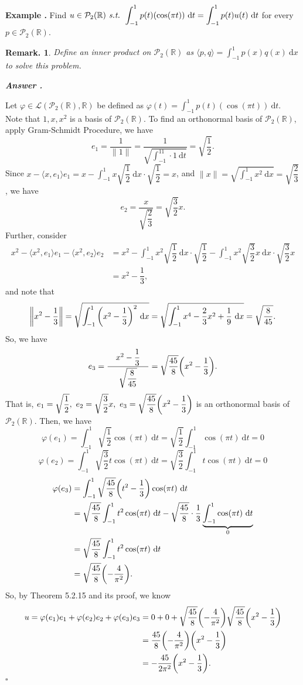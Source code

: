 \documentclass[11pt, letterpaper]{article}
\newcounter{index}[subsection]
\newenvironment*{eg}{\begin{framed}\par\noindent\textbf{Example \thesubsection.\stepcounter{index}\theindex}}{\par\end{framed}}
\newcounter{nprf}[subsection]
\newenvironment*{ans}{\par\indent\textbf{\textit{Answer \stepcounter{nprf}\thenprf.}}\par}{\hfill{$\square$}\par}
\newtheorem*{rmk}{Remark.}
\def\dsst{\displaystyle}
\def\R{\mathbb{R}}
\def\d{\mathrm{d}}
\def\P{\mathcal{P}}
\def\L{\mathcal{L}}
\def\phi{\varphi}
\def\st{\emph{ s.t. }}
\begin{document}
\begin{eg}{}
	Find $u\in\P_2(\R)\st\dsst\int_{-1}^1p(t)(\cos(\pi t))\ \d t=\int_{-1}^1p(t)u(t)\ \d t$ for every $p\in\P_2(\R)$.
	\begin{rmk} Define an inner product on $\P_2(\R)$ as $\langle p,q\rangle=\dsst\int_{-1}^1p(x)q(x)\ \d x$ to solve this problem.\end{rmk}
	\begin{ans}
		Let $\phi\in\L(\P_2(\R),\R)$ be defined as $\phi(t)=\dsst\int_{-1}^1p(t)(\cos(\pi t))\ \d t$. Note that $1,x,x^2$ is a basis of $\P_2(\R)$. To find an orthonormal basis of $\P_2(\R)$, apply Gram-Schmidt Procedure, we have \[e_1=\dfrac{1}{\|1\|}=\dfrac{1}{\sqrt{\dsst\int_{-1}^11\cdot1\ \d t}}=\sqrt{\dfrac{1}{2}}.\] Since $x-\langle x,e_1\rangle e_1=x-\dsst\int_{-1}^1x\sqrt{\dfrac{1}{2}}\ \d x\cdot\sqrt{\dfrac{1}{2}}=x$, and $\|x\|=\sqrt{\dsst\int_{-1}^1x^2\ \d x}=\sqrt{\dfrac{2}{3}}$, we have \[e_2=\dfrac{x}{\sqrt{\dfrac{2}{3}}}=\sqrt{\dfrac{3}{2}}x.\] Further, consider \[\begin{aligned}x^2-\langle x^2,e_1\rangle e_1-\langle x^2,e_2\rangle e_2&=x^2-\dsst\int_{-1}^1x^2\sqrt{\dfrac{1}{2}}\ \d x\cdot\sqrt{\dfrac{1}{2}}-\int_{-1}^1x^2\sqrt{\dfrac{3}{2}}x\ \d x\cdot\sqrt{\dfrac{3}{2}}x\\&=x^2-\dfrac{1}{3},\end{aligned}\] and note that \[\left\|x^2-\dfrac{1}{3}\right\|=\sqrt{\int_{-1}^1\qty(x^2-\dfrac{1}{3})^2\ \d x}=\sqrt{\int_{-1}^1x^4-\dfrac{2}{3}x^2+\dfrac{1}{9}\ \d x}=\sqrt{\dfrac{8}{45}}.\] So, we have \[e_3=\dfrac{\ \ \ x^2-\dfrac{1}{3}\ \ \ }{\sqrt{\dfrac{8}{45}}}=\sqrt{\dfrac{45}{8}}\qty(x^2-\dfrac{1}{3}).\] That is, $e_1=\sqrt{\dfrac{1}{2}},\ e_2=\sqrt{\dfrac{3}{2}}x,\ e_3=\sqrt{\dfrac{45}{8}}\qty(x^2-\dfrac{1}{3})$ is an orthonormal basis of $\P_2(\R)$. Then, we have \[\phi(e_1)=\int_{-1}^1\sqrt{\dfrac{1}{2}}\cos(\pi t)\ \d t=\sqrt{\dfrac{1}{2}}\int_{-1}^1\cos(\pi t)\ \d t=0\] \[\phi(e_2)=\int_{-1}^1\sqrt{\dfrac{3}{2}}t\cos(\pi t)\ \d t=\sqrt{\dfrac{3}{2}}\int_{-1}^1t\cos(\pi t)\ \d t=0\] \[\begin{aligned}\phi(e_3)&=\int_{-1}^1\sqrt{\dfrac{45}{8}}\qty(t^2-\dfrac{1}{3})\cos(\pi t)\ \d t\\&=\sqrt{\dfrac{45}{8}}\int_{-1}^1t^2\cos(\pi t)\ \d t-\sqrt{\dfrac{45}{8}}\cdot\dfrac{1}{3}\underbrace{\int_{-1}^1\cos(\pi t)\ \d t}_0\\&=\sqrt{\dfrac{45}{8}}\int_{-1}^1t^2\cos(\pi t)\ \d t\\&=\sqrt{\dfrac{45}{8}}\qty(-\dfrac{4}{\pi^2}).\end{aligned}\] So, by Theorem 5.2.15 and its proof, we know \[\begin{aligned} u=\phi(e_1)e_1+\phi(e_2)e_2+\phi(e_3)e_3&=0+0+\sqrt{\dfrac{45}{8}}\qty(-\dfrac{4}{\pi^2})\sqrt{\dfrac{45}{8}}\qty(x^2-\dfrac{1}{3})\\&=\dfrac{45}{8}\qty(-\dfrac{4}{\pi^2})\qty(x^2-\dfrac{1}{3})\\&=-\dfrac{45}{2\pi^2}\qty(x^2-\dfrac{1}{3}).\end{aligned}\]
	\end{ans}
\end{eg}
\end{document}
